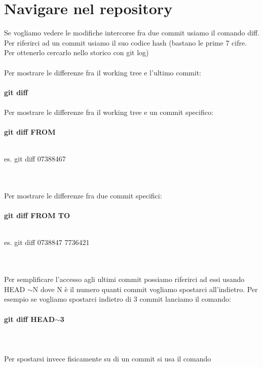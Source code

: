 \documentclass[a4paper,12pt]{report}
\begin{document}
\chapter{Navigare nel repository}
Se vogliamo vedere le modifiche intercorse fra due commit usiamo il comando diff. Per riferirci ad un commit usiamo il suo codice hash (bastano le prime 7 cifre. Per ottenerlo cercarlo nello storico con git log)
\\\\
Per mostrare le differenze fra il working tree e l'ultimo commit:
\\\\
\textbf{git diff}
\\\\
Per mostrare le differenze fra il working tree e un commit specifico:
\\\\
\textbf{git diff FROM}
\\\\
\centerline{es. git diff 07388467}
\\\\
Per mostrare le differenze fra due commit specifici:
\\\\
\textbf{git diff FROM TO}
\\\\
\centerline{es. git diff 0738847 7736421}
\\\\
Per semplificare l'accesso agli ultimi commit possiamo riferirci ad essi usando HEAD $\sim$N dove N è il numero quanti  commit vogliamo spostarci all'indietro. Per esempio se vogliamo spostarci indietro di 3 commit lanciamo il comando:
\\\\
\textbf{git diff HEAD$\sim$3}
\\\\\\\\
Per spostarsi invece fisicamente su di un commit si usa il comando 
\end{document}
